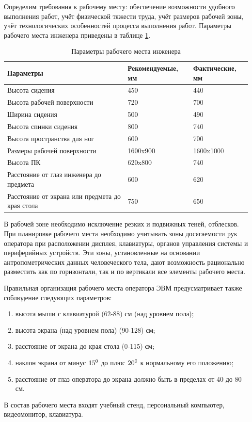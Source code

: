 Определим требования к рабочему месту: обеспечение возможности удобного выполнения работ, учёт физической тяжести труда, учёт размеров рабочей зоны, учёт технологических особенностей процесса выполнения работ. Параметры рабочего места инженера приведены в таблице \ref{tab:arm_ing_locate}.

\begin{longtable}[h!]{|m{}|m{}|m{}|}
\caption{Параметры рабочего места инженера}
\label{tab:arm_ing_locate}
\\ \hline
Параметры &  Рекомендуемые, мм &  Фактические, мм\\\hline
Высота сидения &  450 &  440\\\hline
Высота рабочей поверхности &  720 &  700\\\hline
Ширина сидения &  500 &  490\\\hline
Высота спинки сидения &  800 &  740\\\hline
Высота пространства для ног &  600 &  700\\\hline
Размеры рабочей поверхности &  1600x900 &  1600x1000\\\hline
Высота ПК &  620x800 &  740\\\hline
Расстояние от глаз инженера до предмета &  600 &  620\\\hline
Расстояние от экрана или предмета до края стола &  750 &  650\\\hline
\end{longtable}

В рабочей зоне необходимо исключение резких и подвижных теней, отблесков. При планировке рабочего места необходимо учитывать зоны досягаемости рук оператора при расположении дисплея, клавиатуры, органов управления системы и периферийных устройств. Эти зоны, установленные на основании антропометрических данных человеческого тела, дают возможность рационально разместить как по горизонтали, так и по вертикали все элементы рабочего места.

Правильная организация рабочего места оператора ЭВМ предусматривает также соблюдение следующих параметров:

\begin{enumerate}
\item высота мыши с клавиатурой (62-88) см (над уровнем пола);
\item высота экрана (над уровнем пола) (90-128) см;
\item расстояние от экрана до края стола (0-115) см;
\item наклон экрана от минус $15\textsuperscript{0}$ до плюс $20\textsuperscript{0}$ к нормальному его положению;
\item расстояние от глаз оператора до экрана должно быть в пределах от 40 до 80 см.
\end{enumerate}
В состав рабочего места входят учебный стенд, персональный компьютер, видеомонитор, клавиатура.

